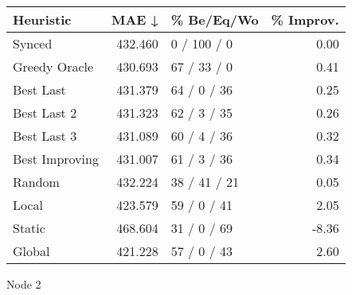 \begin{tabular}{lrlr}
\toprule
\textbf{Heuristic} & \textbf{MAE ↓} & \textbf{\% Be/Eq/Wo} & \textbf{\% Improv.} \\
\midrule
            Synced &        432.460 &          0 / 100 / 0 &                0.00 \\
     Greedy Oracle &        430.693 &          67 / 33 / 0 &                0.41 \\
         Best Last &        431.379 &          64 / 0 / 36 &                0.25 \\
       Best Last 2 &        431.323 &          62 / 3 / 35 &                0.26 \\
       Best Last 3 &        431.089 &          60 / 4 / 36 &                0.32 \\
    Best Improving &        431.007 &          61 / 3 / 36 &                0.34 \\
            Random &        432.224 &         38 / 41 / 21 &                0.05 \\
             Local &        423.579 &          59 / 0 / 41 &                2.05 \\
            Static &        468.604 &          31 / 0 / 69 &               -8.36 \\
            Global &        421.228 &          57 / 0 / 43 &                2.60 \\
\bottomrule
\end{tabular}
\caption{Node 2}
\label{tab:iid_lr01_le1_bs2_2}
